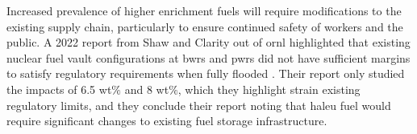 Increased prevalence of higher enrichment fuels will require modifications to the existing supply chain, particularly to ensure continued safety of workers and the public. A 2022 report from Shaw and Clarity out of \gls{ornl} highlighted that existing nuclear fuel vault configurations at \glspl{bwr} and \glspl{pwr} did not have sufficient margins to satisfy regulatory requirements when fully flooded \cite{leup_atf_storage_impacts}. Their report only studied the impacts of 6.5 wt$\%$ and 8 wt$\%$, which they highlight strain existing regulatory limits, and they conclude their report noting that \gls{haleu} fuel would require significant changes to existing fuel storage infrastructure.